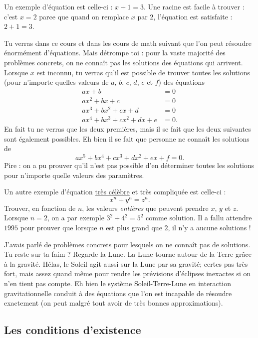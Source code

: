 \documentclass{article}
\begin{document}
Un exemple d'équation est celle-ci : $x+1=3$. Une racine est facile à trouver : c'est $x=2$ parce que quand on remplace $x$ par $2$, l'équation est satisfaite : $2+1=3$.

\begin{remark}
Tu verras dans ce cours et dans les cours de math suivant que l'on peut résoudre énormément d'équations. Mais détrompe toi : pour la vaste majorité des problèmes concrets, on ne connaît pas les solutions des équations qui arrivent. Lorsque $x$ est inconnu, tu verras qu'il est possible de trouver toutes les solutions (pour n'importe quelles valeurs de $a$, $b$, $c$, $d$, $e$ et $f$) des équations
\begin{align*}
ax+b&=0\\
ax^{2}+bx+c&=0\\
ax^{3}+bx^{2}+cx+d&=0\\
ax^{4}+bx^{3}+cx^{2}+dx+e&=0.
\end{align*}
En fait tu ne verras que les deux premières, mais il se fait que les deux suivantes sont également possibles. Eh bien il se fait que personne ne connaît les solutions de
\[ 
  ax^{5}+bx^{4}+cx^{3}+dx^{2}+ex+f=0.
\]
Pire : on a pu prouver qu'il n'est pas possible d'en déterminer toutes les solutions pour n'importe quelle valeurs des paramètres.

Un autre exemple d'équation \href{http://fr.wikipedia.org/wiki/Dernier_théorème_de_Fermat}{très célèbre} et très compliquée est celle-ci :
\[ 
  x^{n}+y^{n}=z^{n}.
\]
Trouver, en fonction de $n$, les valeurs \emph{entières} que peuvent prendre $x$, $y$ et $z$. Lorsque $n=2$, on a par exemple $3^{2}+4^{2}=5^{2}$ comme solution. Il a fallu attendre $1995$ pour prouver que lorsque $n$ est plus grand que $2$, il n'y a aucune solutions !

J'avais parlé de problèmes concrets pour lesquels on ne connaît pas de solutions. Tu reste sur ta faim ? Regarde la Lune. La Lune tourne autour de la Terre grâce à la gravité. Hélas, le Soleil agit aussi sur la Lune par sa gravité; certes pas très fort, mais assez quand même pour rendre les prévisions d'éclipses inexactes si on n'en tient pas compte. Eh bien le système Soleil-Terre-Lune en interaction gravitationnelle conduit à des équations que l'on est incapable de résoudre exactement (on peut malgré tout avoir de très bonnes approximations).
\end{remark}

\subsection{Les conditions d'existence}
\end{document}
